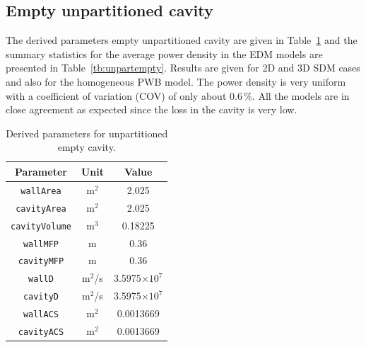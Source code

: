\documentclass[a4paper]{article}
\numberwithin{equation}{section}
\newcounter{Table}
\begin{document}
\subsection[Empty unpartitioned cavity]{Empty unpartitioned cavity}
\label{sc:res:unpartempty}

The derived parameters empty unpartitioned cavity are given in Table~\ref{tb:derivparamsu} and the summary 
statistics for the average power density in the EDM models are presented in Table~\ref{tb:unpartempty}. 
Results are given for 2D and 3D SDM cases and also for the homogeneous PWB model. The power density is very 
uniform with a coefficient of variation (COV) of only about 0.6\,\%. All the models are in close agreement 
as expected since the loss in the cavity is very low.

\begin{table}[ht]
\begin{center}
\begin{tabular}{|c|c|c|}
\hline
\textbf{Parameter}     &\textbf{Unit} &\textbf{Value}\\ 
\hline
\texttt{wallArea}      &m$^2$         &2.025              \\
\texttt{cavityArea}    &m$^2$         &2.025              \\
\texttt{cavityVolume}  &m$^3$         &0.18225            \\
\texttt{wallMFP}       &m             &0.36               \\
\texttt{cavityMFP}     &m             &0.36               \\
\texttt{wallD}         &m$^2$/s       &3.5975$\times10^7$ \\
\texttt{cavityD}       &m$^2$/s       &3.5975$\times10^7$ \\
\texttt{wallACS}       &m$^2$         &0.0013669          \\
\texttt{cavityACS}     &m$^2$         &0.0013669          \\
\hline
\end{tabular}
\end{center}
\caption{\label{tb:derivparamsu} Derived parameters for unpartitioned empty cavity.}
\end{table}
\end{document}
